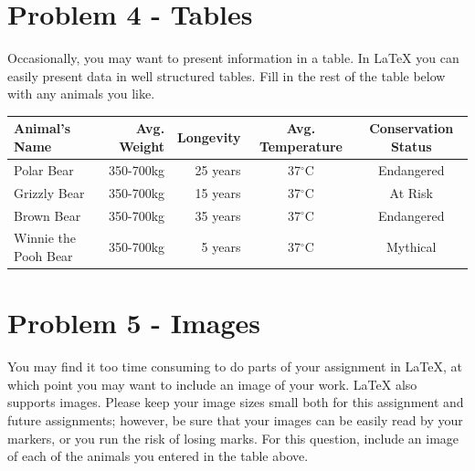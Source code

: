 \documentclass[12pt]{article}
\begin{document}
\section*{Problem 4 - Tables}
Occasionally, you may want to present information in a table. In \LaTeX{} you can easily
 present data in well structured tables. 
Fill in the rest of the table below with any animals you like.\\

 

\begin{tabular}{ | l || r  | r | c | c |} \hline
  Animal's Name & Avg. Weight & Longevity & Avg. Temperature & Conservation Status  \\ \hline
   Polar Bear & 350-700kg & 25 years & 37$^{\circ}$C  & Endangered \\ \hline
   Grizzly Bear & 350-700kg & 15 years & 37$^{\circ}$C  & At Risk \\ \hline
   Brown Bear & 350-700kg & 35 years & 37$^{\circ}$C  & Endangered \\ \hline
   Winnie the Pooh Bear & 350-700kg & 5 years & 37$^{\circ}$C  & Mythical \\ \hline
\end{tabular}

\section*{Problem 5 - Images}
You may find it too time consuming to do parts of your assignment in \LaTeX{}, at which 
point you may want to include an image of your work. \LaTeX{} also supports images. 
Please keep your image sizes small both for this assignment and future assignments; 
however, be sure that your images can be easily read by your markers, or you run the 
risk of losing marks. For this question, include an image of each of the animals you 
entered in the table above.\\

\end{document}

